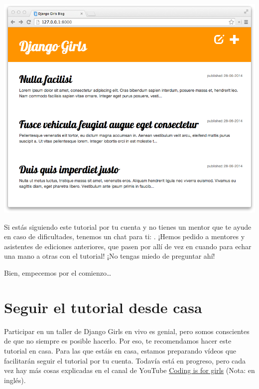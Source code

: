\documentclass[
  a4paper,
  DIV=11,
  numbers=noendperiod,
  onepage,
  openany]{scrreprt}
\begin{document}
\includegraphics{unidades/unidad1/images/paste-2.png}

\begin{tcolorbox}[enhanced jigsaw, left=2mm, coltitle=black, opacityback=0, title=\textcolor{quarto-callout-tip-color}{\faLightbulb}\hspace{0.5em}{Tip}, toprule=.15mm, opacitybacktitle=0.6, bottomtitle=1mm, toptitle=1mm, colbacktitle=quarto-callout-tip-color!10!white, arc=.35mm, colback=white, breakable, rightrule=.15mm, titlerule=0mm, bottomrule=.15mm, colframe=quarto-callout-tip-color-frame, leftrule=.75mm]

Si estás siguiendo este tutorial por tu cuenta y no tienes un mentor que
te ayude en caso de dificultades, tenemos un chat para ti:
\href{https://gitter.im/DjangoGirls/tutorial}{}.
¡Hemos pedido a mentores y asistentes de ediciones anteriores, que pasen
por allí de vez en cuando para echar una mano a otras con el tutorial!
¡No tengas miedo de preguntar ahí!

\end{tcolorbox}

Bien, empecemos por el comienzo\ldots{}

\chapter{Seguir el tutorial desde
casa}\label{seguir-el-tutorial-desde-casa}

Participar en un taller de Django Girls en vivo es genial, pero somos
conscientes de que no siempre es posible hacerlo. Por eso, te
recomendamos hacer este tutorial en casa. Para las que estáis en casa,
estamos preparando vídeos que facilitarán seguir el tutorial por tu
cuenta. Todavía está en progreso, pero cada vez hay más cosas explicadas
en el canal de YouTube
\href{https://www.youtube.com/channel/UC0hNd2uW8jTR5K3KBzRuG2A/feed}{Coding
is for girls} (Nota: en inglés).
\end{document}
